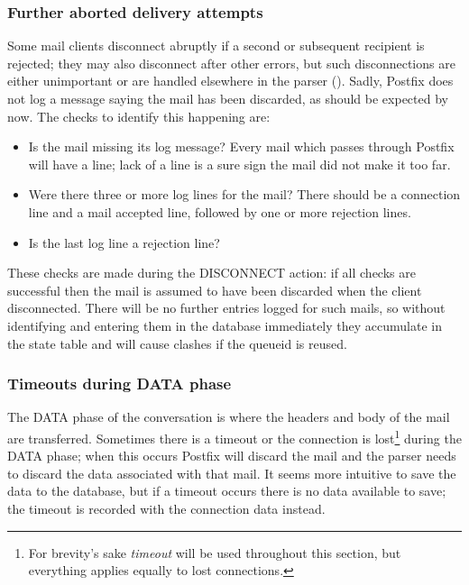 \subsubsection{Further aborted delivery attempts}

Some mail clients disconnect abruptly if a second or subsequent recipient
is rejected; they may also disconnect after other errors, but such
disconnections are either unimportant or are handled elsewhere in the
parser ().  Sadly, Postfix does not
log a message saying the mail has been discarded, as should be expected by
now.  The checks to identify this happening are:

\begin{itemize}

    \item Is the mail missing its  log message?  Every mail
        which passes through Postfix will have a  line;
        lack of a  line is a sure sign the mail did not
        make it too far.

    \item Were there three or more  log lines for the mail?
        There should be a connection line and a mail accepted line,
        followed by one or more rejection lines.

    \item Is the last  log line a rejection line?

\end{itemize}

These checks are made during the DISCONNECT action: if all checks are
successful then the mail is assumed to have been discarded when the client
disconnected.  There will be no further entries logged for such mails, so
without identifying and entering them in the database immediately they
accumulate in the state table and will cause clashes if the queueid is
reused.

\subsubsection{Timeouts during DATA phase}

\label{timeouts-during-data-phase}

The DATA phase of the \SMTP{} conversation is where the headers and body of
the mail are transferred.  Sometimes there is a timeout or the connection
is lost\footnote{For brevity's sake \textit{timeout\/} will be used
throughout this section, but everything applies equally to lost
connections.} during the DATA phase; when this occurs Postfix will discard
the mail and the parser needs to discard the data associated with that
mail.  It seems more intuitive to save the data to the database, but if a
timeout occurs there is no data available to save; the timeout is recorded
with the connection data instead.

